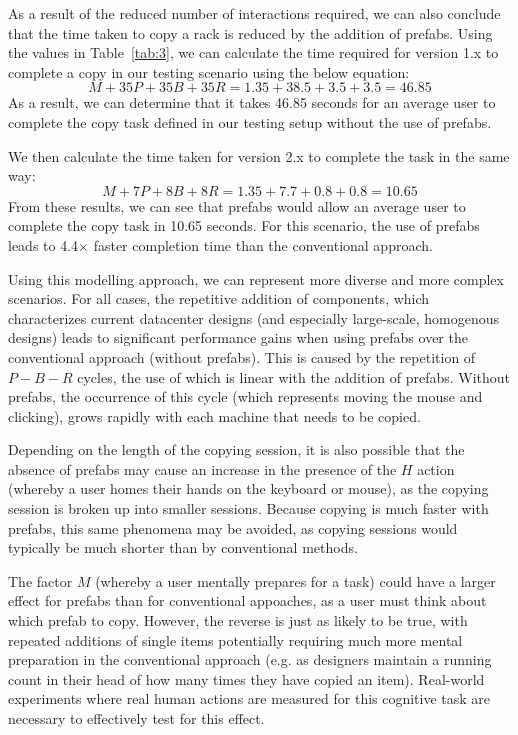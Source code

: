 \documentclass[11pt]{article}
\begin{document}
			As a result of the reduced number of interactions required, we can also conclude that the time taken to copy a rack is reduced by the addition of prefabs.
			Using the values in Table~\ref{tab:3}, we can calculate the time required for version 1.x to complete a copy in our testing scenario using the below equation:
			$$M + 35P + 35B + 35R= 1.35 + 38.5 + 3.5 + 3.5= 46.85$$
			As a result, we can determine that it takes 46.85 seconds for an average user to complete the copy task defined in our testing setup without the use of prefabs.

			We then calculate the time taken for version 2.x to complete the task in the same way:
			$$M + 7P + 8B + 8R= 1.35 + 7.7 + 0.8 + 0.8= 10.65$$
			From these results, we can see that prefabs would allow an average user to complete the copy task in 10.65 seconds.
			For this scenario, the use of prefabs leads to 4.4$\times$ faster completion time than the conventional approach.

			Using this modelling approach, we can represent more diverse and more complex scenarios. 
			For all cases, the repetitive addition of components, which characterizes current datacenter designs (and especially large-scale, homogenous designs) leads to significant performance gains when using prefabs over the conventional approach (without prefabs).
			This is caused by the repetition of $P-B-R$ cycles, the use of which is linear with the addition of prefabs.
			Without prefabs, the occurrence of this cycle (which represents moving the mouse and clicking), grows rapidly with each machine that needs to be copied.
			
			Depending on the length of the copying session, it is also possible that the absence of prefabs may cause an increase in the presence of the $H$ action (whereby a user homes their hands on the keyboard or mouse), as the copying session is broken up into smaller sessions.
			Because copying is much faster with prefabs, this same phenomena may be avoided, as copying sessions would typically be much shorter than by conventional methods.

			The factor $M$ (whereby a user mentally prepares for a task) could have a larger effect for prefabs than for conventional appoaches, as a user must think about which prefab to copy.
			However, the reverse is just as likely to be true, with repeated additions of single items potentially requiring much more mental preparation in the conventional approach (e.g. as designers maintain a running count in their head of how many times they have copied an item).
			Real-world experiments where real human actions are measured for this cognitive task are necessary to effectively test for this effect.
\end{document}
